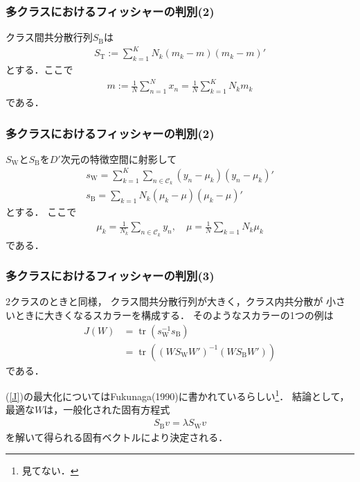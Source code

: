 \documentclass[10pt,%
hyperref={unicode}]{beamer}
\DeclareMathOperator*{\tr}{tr}
\newcommand{\braref}[1]{{\fontfamily{cmr}\selectfont (\ref{#1})}}
\begin{document}
\begin{frame}
    \frametitle{多クラスにおけるフィッシャーの判別(2)}
    クラス間共分散行列$S_\mathrm{B}$は
    \begin{align}
        S_\mathrm{T} := \sum_{k = 1}^K N_k (m_k - m)(m_k - m)' \tag{4.46}
    \end{align}
    とする．ここで
    \begin{align}
        m := \frac{1}{N}\sum_{n = 1}^N x_n = \frac{1}{N}\sum_{k = 1}^K N_k m_k \tag{4.44}
    \end{align}
    である．
\end{frame}

\begin{frame}
    \frametitle{多クラスにおけるフィッシャーの判別(2)}
    $S_\mathrm{W}$と$S_\mathrm{B}$を$D'$次元の特徴空間に射影して
    \begin{gather*}
        s_\mathrm{W} = \sum_{k = 1}^K \sum_{n \in \mathcal{C}_k}
                        (y_n - \mu_k)(y_n - \mu_k)' \tag{4.47} \\
        s_\mathrm{B} = \sum_{k = 1} N_k (\mu_k - \mu)(\mu_k - \mu)'
    \end{gather*}
    とする．
    ここで
    \begin{align}
        \mu_k = \frac{1}{N_k} \sum_{n \in \mathcal{C}_k}y_n,\quad
        \mu = \frac{1}{N} \sum_{k = 1} N_k \mu_k \tag{4.49}
    \end{align}
    である．
\end{frame}

\begin{frame}
    \frametitle{多クラスにおけるフィッシャーの判別(3)}
    2クラスのときと同様，
    クラス間共分散行列が大きく，クラス内共分散が
    小さいときに大きくなるスカラーを構成する．
    そのようなスカラーの1つの例は
    \begin{align}
        J(W) &= \tr (s_\mathrm{W}^{-1}s_\mathrm{B}) \tag{4.50} \\
             &= \tr ((WS_\mathrm{W}W')^{-1}(WS_\mathrm{B}W')) \tag{4.51} \label{J}
    \end{align}
    である．

    \bigskip

    \braref{J}の最大化についてはFukunaga(1990)に書かれているらしい\footnote{見てない．}．
    結論として，最適な$W$は，一般化された固有方程式
    \begin{align*}
        S_\mathrm{B}v = \lambda S_\mathrm{W}v
    \end{align*}
    を解いて得られる固有ベクトルにより決定される．
\end{frame}
\end{document}
